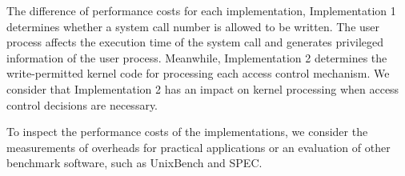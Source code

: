 %
The difference of performance costs for each implementation, Implementation 1
determines whether a system call number is allowed to be written. 
The user process affects the execution time of the system call and generates
privileged information of the user process.
%
Meanwhile, Implementation 2 determines the write-permitted kernel code for
processing each access control mechanism.
%
We consider that Implementation 2 has an impact on kernel processing when
access control decisions are necessary.
%

%  
To inspect the performance costs of the implementations, we consider the
measurements of overheads for practical applications or an evaluation of
other benchmark software, such as UnixBench and SPEC.
%





